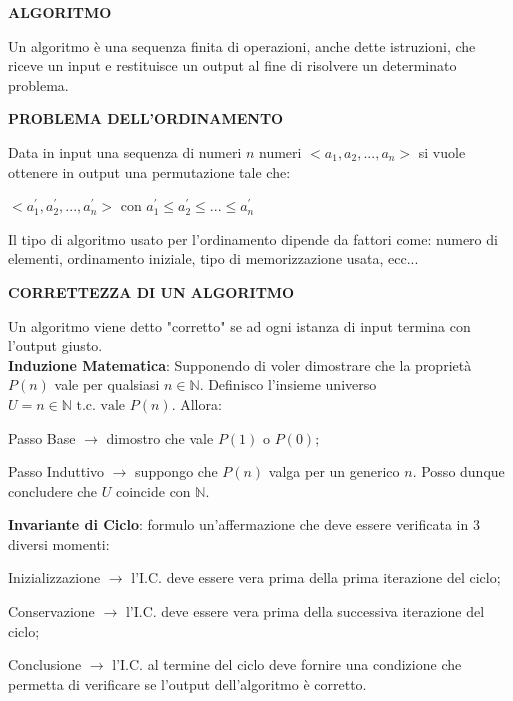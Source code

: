 \documentclass[8pt]{extarticle}
\begin{document}
	\begin{formulario}

		\begin{tcenter}
\textbf{ALGORITMO}
		\end{tcenter}
Un algoritmo è una sequenza finita di operazioni, anche dette istruzioni, che riceve un input e restituisce un output al fine di risolvere un determinato problema.\\
\myRule

		\begin{tcenter}
\textbf{PROBLEMA DELL'ORDINAMENTO} 
		\end{tcenter}
Data in input una sequenza di numeri $n$ numeri $<a_1,a_2,...,a_n>$ si vuole ottenere in output una permutazione tale che:
		\begin{tcenter}
$<a_{1}^{'},a_{2}^{'},...,a_{n}^{'}>$ con $a_{1}^{'} \leq a_{2}^{'} \leq ... \leq a_{n}^{'} $
		\end{tcenter}
Il tipo di algoritmo usato per l'ordinamento dipende da fattori come: numero di elementi, ordinamento iniziale, tipo di memorizzazione usata, ecc...\\
\myRule

		\begin{tcenter}
\textbf{CORRETTEZZA DI UN ALGORITMO}
		\end{tcenter}
Un algoritmo viene detto "corretto" se ad ogni istanza di input termina con l'output giusto.\\
\textbf{Induzione Matematica}: Supponendo di voler dimostrare che la proprietà $P(n)$ vale per qualsiasi $n\in \mathbb{N}$. Definisco l'insieme universo $U={n\in\mathbb{N}\text{ t.c. vale } P(n)}$. Allora:\\

	\begin{descr}{1}
		\item[Passo Base]$\rightarrow$ dimostro che vale $P(1)$ o $P(0)$; 
		\item[Passo Induttivo]$\rightarrow$ suppongo che $P(n)$ valga per un generico $n$. Posso dunque concludere che $U$ coincide con $\mathbb{N}$.
	\end{descr}
\textbf{Invariante di Ciclo}: formulo un'affermazione che deve essere verificata in 3 diversi momenti:\\
	\begin{descr}{1}
		\item[Inizializzazione]$\rightarrow$ l'I.C. deve essere vera prima della prima iterazione del ciclo;
		\item[Conservazione]$\rightarrow$ l'I.C. deve essere vera prima della successiva iterazione del ciclo;
		\item[Conclusione]$\rightarrow$ l'I.C. al termine del ciclo deve fornire una condizione che permetta di verificare se l'output dell'algoritmo è corretto.
	\end{descr}
\myRule


\end{formulario}
\end{document}

